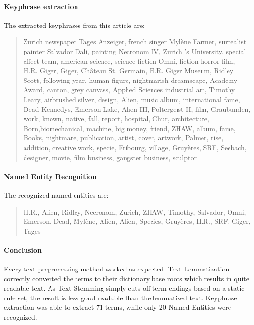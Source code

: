 \paragraph{Keyphrase extraction}
The extracted keyphrases from this article are:
\begin{quote}
    Zurich newspaper Tages Anzeiger, french singer Mylène Farmer, surrealist painter Salvador Dali,
    painting Necronom IV, Zurich ’s University, special effect team, american science, science fiction Omni,
    fiction horror film, H.R. Giger, Giger, Château St. Germain, H.R. Giger Museum, Ridley Scott,
    following year, human figure, nightmarish dreamscape, Academy Award, canton, grey canvass, Applied Sciences
    industrial art, Timothy Leary, airbrushed silver, design, Alien, music album, international fame,
    Dead Kennedys, Emerson Lake, Alien III, Poltergeist II, film, Graubünden, work, known, native, fall, report,
    hospital, Chur, architecture, Born,biomechanical, machine, big money, friend, ZHAW, album, fame, Books,
    nightmare, publication, artist, cover, artwork, Palmer, rise, addition, creative work, specie, Fribourg,
    village, Gruyères, SRF, Seebach, designer, movie, film business, gangster business, sculptor
\end{quote}

\paragraph{Named Entity Recognition}
The recognized named entities are:
\begin{quote}
    H.R., Alien, Ridley, Necronom, Zurich, ZHAW, Timothy, Salvador, Omni, Emerson, Dead, Mylène, Alien, Alien,
    Species, Gruyères, H.R., SRF, Giger, Tages
\end{quote}

\paragraph{Conclusion}
Every text preprocessing method worked as expected.
Text Lemmatization correctly converted the terms to their dictionary base roots
which results in quite readable text.
As Text Stemming simply cuts off term endings based on a static rule set, the result is less
good readable than the lemmatized text.
Keyphrase extraction was able to extract 71 terms, while only 20 Named Entities were recognized.
